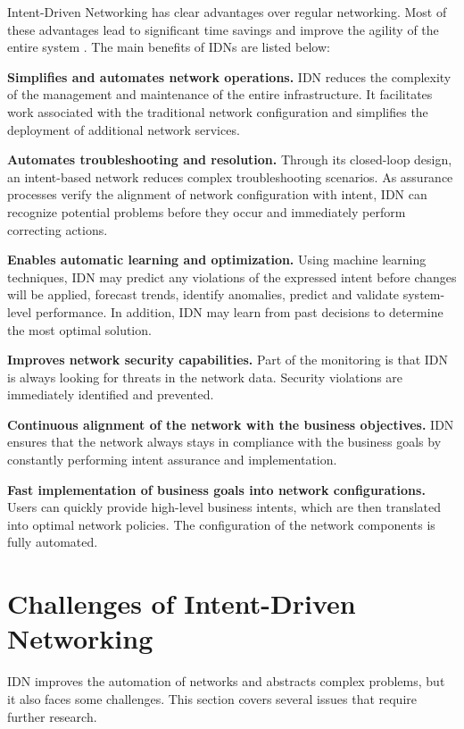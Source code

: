 Intent-Driven Networking has clear advantages over regular networking. Most of these advantages lead to significant time savings and improve the agility of the entire system \cite{Kolibri}. The main benefits of IDNs are listed below: \cite[11]{MartinezJulia2022}

\textbf{Simplifies and automates network operations.} IDN reduces the complexity of the management and maintenance of the entire infrastructure. It facilitates work associated with the traditional network configuration and simplifies the deployment of additional network services.

\textbf{Automates troubleshooting and resolution.} Through its closed-loop design, an intent-based network reduces complex troubleshooting scenarios. As assurance processes verify the alignment of network configuration with intent, IDN can recognize potential problems before they occur and immediately perform correcting actions.

\textbf{Enables automatic learning and optimization.} Using machine learning techniques, IDN may predict any violations of the expressed intent before changes will be applied, forecast trends, identify anomalies, predict and validate system-level performance. In addition, IDN may learn from past decisions to determine the most optimal solution.

\textbf{Improves network security capabilities.} Part of the monitoring is that IDN is always looking for threats in the network data. Security violations are immediately identified and prevented.

\textbf{Continuous alignment of the network with the business objectives.} IDN ensures that the network always stays in compliance with the business goals by constantly performing intent assurance and implementation.

\textbf{Fast implementation of business goals into network configurations.} Users can quickly provide high-level business intents, which are then translated into optimal network policies. The configuration of the network components is fully automated.



\section{Challenges of Intent-Driven Networking}

IDN improves the automation of networks and abstracts complex problems, but it also faces some challenges. This section covers several issues that require further research.

